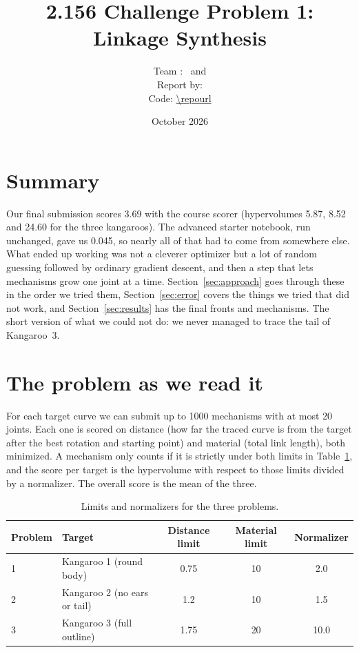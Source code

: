 \documentclass[11pt]{article}
\title{2.156 Challenge Problem 1: Linkage Synthesis}
\author{Team \teamname: \authorone\ and \authortwo\\[6pt]
\normalsize Report by: \authorone\\[2pt]
\normalsize Code: \url{\repourl}}
\date{October 2026}
\begin{document}
\maketitle

\section{Summary}

Our final submission scores 3.69 with the course scorer (hypervolumes 5.87,
8.52 and 24.60 for the three kangaroos). The advanced starter notebook, run
unchanged, gave us 0.045, so nearly all of that had to come from somewhere
else. What ended up working was not a cleverer optimizer but a lot of random
guessing followed by ordinary gradient descent, and then a step that lets
mechanisms grow one joint at a time. Section~\ref{sec:approach} goes through
these in the order we tried them, Section~\ref{sec:error} covers the things we
tried that did not work, and Section~\ref{sec:results} has the final fronts and
mechanisms. The short version of what we could not do: we never managed to
trace the tail of Kangaroo~3.

\section{The problem as we read it}

For each target curve we can submit up to 1000 mechanisms with at most 20
joints. Each one is scored on distance (how far the traced curve is from the
target after the best rotation and starting point) and material (total link
length), both minimized. A mechanism only counts if it is strictly under both
limits in Table~\ref{tab:problems}, and the score per target is the hypervolume
with respect to those limits divided by a normalizer. The overall score is the
mean of the three.

\begin{table}[H]
\centering
\begin{tabular}{llccc}
\toprule
Problem & Target & Distance limit & Material limit & Normalizer \\
\midrule
1 & Kangaroo 1 (round body) & 0.75 & 10 & 2.0 \\
2 & Kangaroo 2 (no ears or tail) & 1.2 & 10 & 1.5 \\
3 & Kangaroo 3 (full outline) & 1.75 & 20 & 10.0 \\
\bottomrule
\end{tabular}
\caption{Limits and normalizers for the three problems.}
\label{tab:problems}
\end{table}
\end{document}
